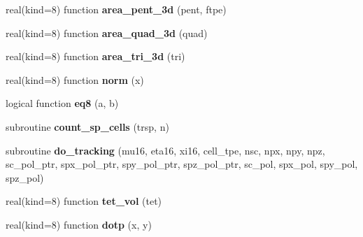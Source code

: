\begin{DoxyCompactItemize}
\item 
\hypertarget{classsct__module_a111d3cf1cb8c5090ca34e2dbaa5b8905}{real(kind=8) function {\bfseries area\-\_\-pent\-\_\-3d} (pent, ftpe)}\label{classsct__module_a111d3cf1cb8c5090ca34e2dbaa5b8905}

\item 
\hypertarget{classsct__module_a025eb7c029104b3858e557cee5b12121}{real(kind=8) function {\bfseries area\-\_\-quad\-\_\-3d} (quad)}\label{classsct__module_a025eb7c029104b3858e557cee5b12121}

\item 
\hypertarget{classsct__module_a0f3c4e2a28f70b484ef26970a52a76e8}{real(kind=8) function {\bfseries area\-\_\-tri\-\_\-3d} (tri)}\label{classsct__module_a0f3c4e2a28f70b484ef26970a52a76e8}

\item 
\hypertarget{classsct__module_aec862dbf2e4e80f17db53cd8306bbed7}{real(kind=8) function {\bfseries norm} (x)}\label{classsct__module_aec862dbf2e4e80f17db53cd8306bbed7}

\item 
\hypertarget{classsct__module_a59a3cd06ec53359e8cd47e366b243b92}{logical function {\bfseries eq8} (a, b)}\label{classsct__module_a59a3cd06ec53359e8cd47e366b243b92}

\item 
\hypertarget{classsct__module_a19d4913fc9ef994f20e23a20dd881ff0}{subroutine {\bfseries count\-\_\-sp\-\_\-cells} (trsp, n)}\label{classsct__module_a19d4913fc9ef994f20e23a20dd881ff0}

\item 
\hypertarget{classsct__module_a0044302864c5b5ac14b1fc1ec7670e14}{subroutine {\bfseries do\-\_\-tracking} (mu16, eta16, xi16, cell\-\_\-tpe, nsc, npx, npy, npz, sc\-\_\-pol\-\_\-ptr, spx\-\_\-pol\-\_\-ptr, spy\-\_\-pol\-\_\-ptr, spz\-\_\-pol\-\_\-ptr, sc\-\_\-pol, spx\-\_\-pol, spy\-\_\-pol, spz\-\_\-pol)}\label{classsct__module_a0044302864c5b5ac14b1fc1ec7670e14}

\item 
\hypertarget{classsct__module_ae2cb787125f2e72b125cc4b2d8c2bf51}{real(kind=8) function {\bfseries tet\-\_\-vol} (tet)}\label{classsct__module_ae2cb787125f2e72b125cc4b2d8c2bf51}

\item 
\hypertarget{classsct__module_a6cf216a96528fa5d45fe618a558e6743}{real(kind=8) function {\bfseries dotp} (x, y)}\label{classsct__module_a6cf216a96528fa5d45fe618a558e6743}


\end{DoxyCompactItemize}
